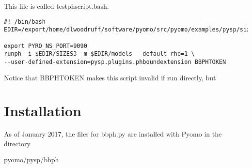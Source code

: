 \documentclass[12pt]{article}
\begin{document}
This file is called testphscript.bash.
\begin{verbatim}
#! /bin/bash
EDIR=/export/home/dlwoodruff/software/pyomo/src/pyomo/examples/pysp/sizes

export PYRO_NS_PORT=9090
runph -i $EDIR/SIZES3 -m $EDIR/models --default-rho=1 \
--user-defined-extension=pysp.plugins.phboundextension BBPHTOKEN
\end{verbatim}

Notice that BBPHTOKEN makes this script invalid if run directly, but 

\section{Installation}

As of January 2017, the files for bbph.py are installed with Pyomo in the directory

pyomo/pysp/bbph



\end{document}
